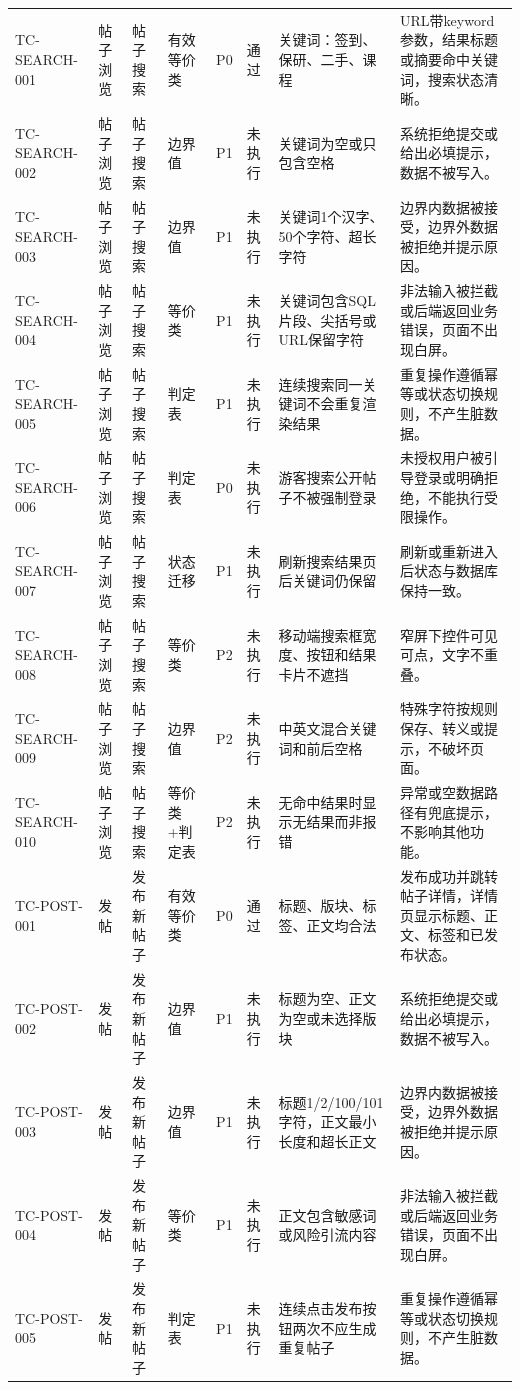 \documentclass[UTF8,zihao=-4]{ctexart}
\begin{document}
{\begin{longtable}{P{1.8cm}P{1.7cm}P{2.2cm}P{1.8cm}P{1cm}P{1.2cm}P{4.1cm}P{5.3cm}}
TC-SEARCH-001 & 帖子浏览 & 帖子搜索 & 有效等价类 & P0 & 通过 & 关键词：签到、保研、二手、课程 & URL带keyword参数，结果标题或摘要命中关键词，搜索状态清晰。 \\
TC-SEARCH-002 & 帖子浏览 & 帖子搜索 & 边界值 & P1 & 未执行 & 关键词为空或只包含空格 & 系统拒绝提交或给出必填提示，数据不被写入。 \\
TC-SEARCH-003 & 帖子浏览 & 帖子搜索 & 边界值 & P1 & 未执行 & 关键词1个汉字、50个字符、超长字符 & 边界内数据被接受，边界外数据被拒绝并提示原因。 \\
TC-SEARCH-004 & 帖子浏览 & 帖子搜索 & 等价类 & P1 & 未执行 & 关键词包含SQL片段、尖括号或URL保留字符 & 非法输入被拦截或后端返回业务错误，页面不出现白屏。 \\
TC-SEARCH-005 & 帖子浏览 & 帖子搜索 & 判定表 & P1 & 未执行 & 连续搜索同一关键词不会重复渲染结果 & 重复操作遵循幂等或状态切换规则，不产生脏数据。 \\
TC-SEARCH-006 & 帖子浏览 & 帖子搜索 & 判定表 & P0 & 未执行 & 游客搜索公开帖子不被强制登录 & 未授权用户被引导登录或明确拒绝，不能执行受限操作。 \\
TC-SEARCH-007 & 帖子浏览 & 帖子搜索 & 状态迁移 & P1 & 未执行 & 刷新搜索结果页后关键词仍保留 & 刷新或重新进入后状态与数据库保持一致。 \\
TC-SEARCH-008 & 帖子浏览 & 帖子搜索 & 等价类 & P2 & 未执行 & 移动端搜索框宽度、按钮和结果卡片不遮挡 & 窄屏下控件可见可点，文字不重叠。 \\
TC-SEARCH-009 & 帖子浏览 & 帖子搜索 & 边界值 & P2 & 未执行 & 中英文混合关键词和前后空格 & 特殊字符按规则保存、转义或提示，不破坏页面。 \\
TC-SEARCH-010 & 帖子浏览 & 帖子搜索 & 等价类+判定表 & P2 & 未执行 & 无命中结果时显示无结果而非报错 & 异常或空数据路径有兜底提示，不影响其他功能。 \\
TC-POST-001 & 发帖 & 发布新帖子 & 有效等价类 & P0 & 通过 & 标题、版块、标签、正文均合法 & 发布成功并跳转帖子详情，详情页显示标题、正文、标签和已发布状态。 \\
TC-POST-002 & 发帖 & 发布新帖子 & 边界值 & P1 & 未执行 & 标题为空、正文为空或未选择版块 & 系统拒绝提交或给出必填提示，数据不被写入。 \\
TC-POST-003 & 发帖 & 发布新帖子 & 边界值 & P1 & 未执行 & 标题1/2/100/101字符，正文最小长度和超长正文 & 边界内数据被接受，边界外数据被拒绝并提示原因。 \\
TC-POST-004 & 发帖 & 发布新帖子 & 等价类 & P1 & 未执行 & 正文包含敏感词或风险引流内容 & 非法输入被拦截或后端返回业务错误，页面不出现白屏。 \\
TC-POST-005 & 发帖 & 发布新帖子 & 判定表 & P1 & 未执行 & 连续点击发布按钮两次不应生成重复帖子 & 重复操作遵循幂等或状态切换规则，不产生脏数据。 \\

\end{longtable}}
\end{document}
